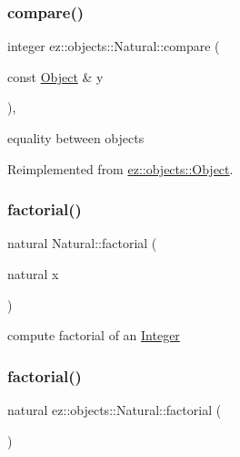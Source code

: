 \subsubsection{\texorpdfstring{compare()}{compare()}}
{\footnotesize\ttfamily integer ez\+::objects\+::\+Natural\+::compare (\begin{DoxyParamCaption}\item[{const \hyperlink{classez_1_1objects_1_1Object}{Object} \&}]{y }\end{DoxyParamCaption})\hspace{0.3cm}{\ttfamily [inline]}, {\ttfamily [virtual]}}

equality between objects 

Reimplemented from \hyperlink{classez_1_1objects_1_1Object_aca311d389dffa204e425463145f4e1e6}{ez\+::objects\+::\+Object}.

\mbox{\label{classez_1_1objects_1_1Natural_a9f7810c41265e58a814dc7f1308bc4a7}} 
\subsubsection{\texorpdfstring{factorial()}{factorial()}\hspace{0.1cm}{\footnotesize\ttfamily [1/2]}}
{\footnotesize\ttfamily natural Natural\+::factorial (\begin{DoxyParamCaption}\item[{natural}]{x }\end{DoxyParamCaption})\hspace{0.3cm}{\ttfamily [static]}}

compute factorial of an \hyperlink{classez_1_1objects_1_1Integer}{Integer} \mbox{\label{classez_1_1objects_1_1Natural_a75b96a4e89a16c846ee492e25db2effb}} 
\subsubsection{\texorpdfstring{factorial()}{factorial()}\hspace{0.1cm}{\footnotesize\ttfamily [2/2]}}
{\footnotesize\ttfamily natural ez\+::objects\+::\+Natural\+::factorial (\begin{DoxyParamCaption}{ }\end{DoxyParamCaption})\hspace{0.3cm}{\ttfamily [inline]}}

